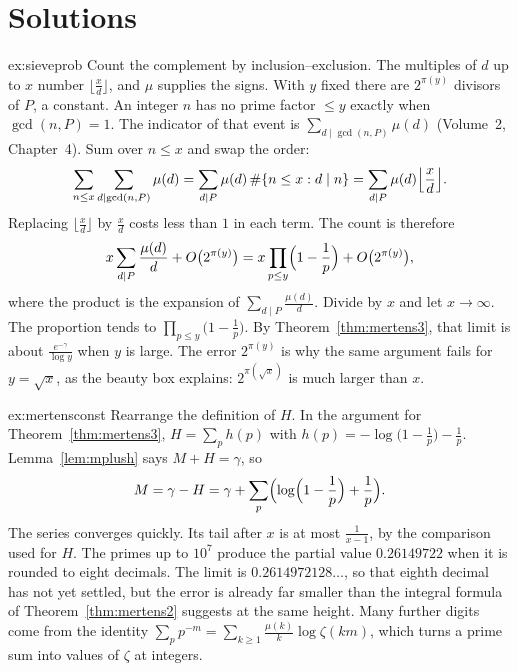 \section{Solutions}

\begin{solution}{ex:sieveprob}
\idea Count the complement by inclusion--exclusion. The multiples of $d$ up to $x$ number $\bigl\lfloor\frac xd\bigr\rfloor$, and $\mu$ supplies the signs. With $y$ fixed there are $2^{\pi(y)}$ divisors of $P$, a constant.
\writeup An integer $n$ has no prime factor $\le y$ exactly when $\gcd(n,P)=1$. The indicator of that event is $\sum_{d\mid\gcd(n,P)}\mu(d)$ (Volume~2, Chapter~4). Sum over $n\le x$ and swap the order:
\[
\sum_{n\le x}\sum_{d\mid\gcd(n,P)}\mu(d)=\sum_{d\mid P}\mu(d)\,\#\{n\le x:d\mid n\}=\sum_{d\mid P}\mu(d)\Bigl\lfloor\frac xd\Bigr\rfloor.
\]
Replacing $\bigl\lfloor\frac xd\bigr\rfloor$ by $\frac xd$ costs less than $1$ in each term. The count is therefore
\[
x\sum_{d\mid P}\frac{\mu(d)}d+O\bigl(2^{\pi(y)}\bigr)=x\prod_{p\le y}\Bigl(1-\frac1p\Bigr)+O\bigl(2^{\pi(y)}\bigr),
\]
where the product is the expansion of $\sum_{d\mid P}\frac{\mu(d)}d$. Divide by $x$ and let $x\to\infty$. The proportion tends to $\prod_{p\le y}\bigl(1-\frac1p\bigr)$. By Theorem~\ref{thm:mertens3}, that limit is about $\frac{e^{-\gamma}}{\log y}$ when $y$ is large. The error $2^{\pi(y)}$ is why the same argument fails for $y=\sqrt x$, as the beauty box explains: $2^{\pi(\sqrt x)}$ is much larger than $x$.
\end{solution}

\begin{solution}{ex:mertensconst}
\idea Rearrange the definition of $H$.
\writeup In the argument for Theorem~\ref{thm:mertens3}, $H=\sum_ph(p)$ with $h(p)=-\log\bigl(1-\frac1p\bigr)-\frac1p$. Lemma~\ref{lem:mplush} says $M+H=\gamma$, so
\[
M=\gamma-H=\gamma+\sum_p\Bigl(\log\Bigl(1-\frac1p\Bigr)+\frac1p\Bigr).
\]
The series converges quickly. Its tail after $x$ is at most $\frac1{x-1}$, by the comparison used for $H$. The primes up to $10^7$ produce the partial value $0.26149722$ when it is rounded to eight decimals. The limit is $0.2614972128\ldots$, so that eighth decimal has not yet settled, but the error is already far smaller than the integral formula of Theorem~\ref{thm:mertens2} suggests at the same height. Many further digits come from the identity $\sum_pp^{-m}=\sum_{k\ge 1}\frac{\mu(k)}k\log\zeta(km)$, which turns a prime sum into values of $\zeta$ at integers.
\end{solution}

